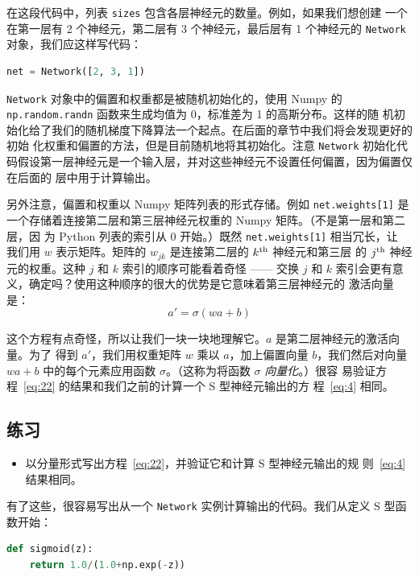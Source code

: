 在这段代码中，列表 \lstinline!sizes! 包含各层神经元的数量。例如，如果我们想创建
一个在第一层有 2 个神经元，第二层有 3 个神经元，最后层有 1 个神经元的
\lstinline!Network! 对象，我们应这样写代码：
\begin{lstlisting}[language=Python]
net = Network([2, 3, 1])
\end{lstlisting}

\lstinline!Network! 对象中的偏置和权重都是被随机初始化的，使用 Numpy 的
\lstinline!np.random.randn! 函数来生成均值为 0，标准差为 1 的高斯分布。这样的随
机初始化给了我们的随机梯度下降算法一个起点。在后面的章节中我们将会发现更好的初始
化权重和偏置的方法，但是目前随机地将其初始化。注意 \lstinline!Network! 初始化代
码假设第一层神经元是一个输入层，并对这些神经元不设置任何偏置，因为偏置仅在后面的
层中用于计算输出。

另外注意，偏置和权重以 Numpy 矩阵列表的形式存储。例如 \lstinline!net.weights[1]!
是一个存储着连接第二层和第三层神经元权重的 Numpy 矩阵。（不是第一层和第二层，因
  为 Python 列表的索引从 0 开始。）既然 \lstinline!net.weights[1]! 相当冗长，让
我们用 $w$ 表示矩阵。矩阵的 $w_{jk}$ 是连接第二层的 $k^{\rm th}$ 神经元和第三层
的 $j^{\rm th}$ 神经元的权重。这种 $j$ 和 $k$ 索引的顺序可能看着奇怪 —— 交换 $j$
和 $k$ 索引会更有意义，确定吗？使用这种顺序的很大的优势是它意味着第三层神经元的
激活向量是：
\begin{equation}
  a' = \sigma(w a + b)
  \label{eq:22}\tag{22}
\end{equation}

这个方程有点奇怪，所以让我们一块一块地理解它。$a$ 是第二层神经元的激活向量。为了
得到 $a'$，我们用权重矩阵 $w$ 乘以 $a$，加上偏置向量 $b$，我们然后对向量 $w a
+b$ 中的每个元素应用函数 $\sigma$。（这称为将函数 $\sigma$ \emph{向量化}。）很容
易验证方程~\eqref{eq:22} 的结果和我们之前的计算一个 S 型神经元输出的方
程~\eqref{eq:4} 相同。

\subsection*{练习}

\begin{itemize}
\item 以分量形式写出方程~\eqref{eq:22}，并验证它和计算 S 型神经元输出的规
  则~\eqref{eq:4} 结果相同。
\end{itemize}

有了这些，很容易写出从一个 \lstinline!Network! 实例计算输出的代码。我们从定义 S
型函数开始：
\begin{lstlisting}[language=Python]
def sigmoid(z):
    return 1.0/(1.0+np.exp(-z))
\end{lstlisting}

